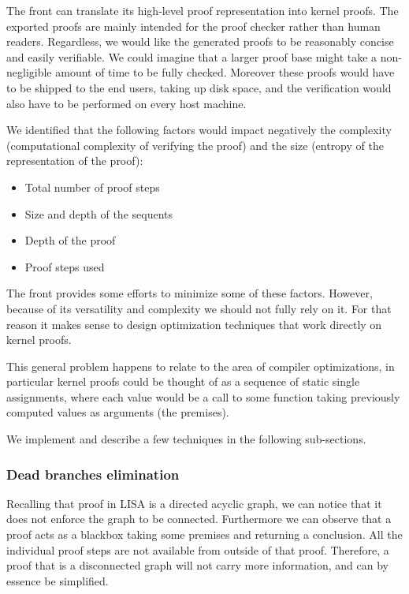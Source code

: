 The front can translate its high-level proof representation into kernel proofs. The exported proofs are mainly intended for the proof checker rather than human readers. Regardless, we would like the generated proofs to be reasonably concise and easily verifiable. We could imagine that a larger proof base might take a non-negligible amount of time to be fully checked. Moreover these proofs would have to be shipped to the end users, taking up disk space, and the verification would also have to be performed on every host machine.

We identified that the following factors would impact negatively the complexity (computational complexity of verifying the proof) and the size (entropy of the representation of the proof):

\begin{itemize}
  \item Total number of proof steps
  \item Size and depth of the sequents
  \item Depth of the proof
  \item Proof steps used
\end{itemize}

The front provides some efforts to minimize some of these factors. However, because of its versatility and complexity we should not fully rely on it. For that reason it makes sense to design optimization techniques that work directly on kernel proofs.

This general problem happens to relate to the area of compiler optimizations, in particular kernel proofs could be thought of as a sequence of static single assignments, where each value would be a call to some function taking previously computed values as arguments (the premises).

We implement and describe a few techniques in the following sub-sections.

\subsubsection{Dead branches elimination}

Recalling that proof in LISA is a directed acyclic graph, we can notice that it does not enforce the graph to be connected. Furthermore we can observe that a proof acts as a blackbox taking some premises and returning a conclusion. All the individual proof steps are not available from outside of that proof. Therefore, a proof that is a disconnected graph will not carry more information, and can by essence be simplified.

